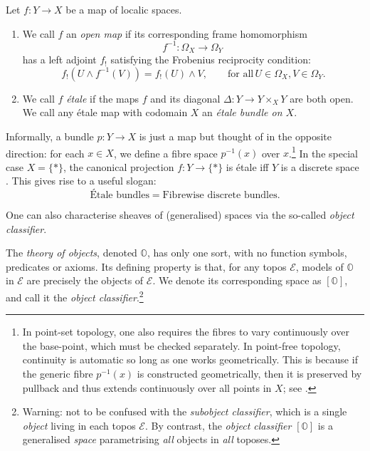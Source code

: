 \documentclass[a4paper, 11pt,reqno]{amsart}
\newcommand{\E}{\mathcal{E}}
\begin{document}
\begin{definition}\label{def:etale} Let $f\colon Y\rightarrow X$ be a map of localic spaces. 
\begin{enumerate}[label=(\roman*)]
	\item We call $f$ an {\em open map} if its corresponding frame homomorphism 
	$$f^{-1}\colon\Omega_{X}\rightarrow\Omega_Y\,$$
	has a left adjoint $f_!$ satisfying the Frobenius reciprocity condition:
	\[f_!(U\land f^{-1}(V))=f_!(U)\land V,\qquad\text{for all}\, U\in\Omega_X,V\in\Omega_{Y}.\]
	\item We call $f$ \emph{\'{e}tale} if the maps $f$ and its diagonal $\Delta\colon Y\to Y\times_X Y$ are both open. We call any \'{e}tale map with codomain $X$ an \emph{\'{e}tale bundle on $X$}. 
\end{enumerate}
\end{definition}

\begin{discussion}\label{dis:fibrewiseDISCRETE} Informally, a bundle $p\colon Y\to X$ is just a map but thought of in the opposite direction: for each $x\in X$, we define a fibre space $p^{-1}(x)$ over $x$.\footnote{In point-set topology, one also requires the fibres to vary continuously over the base-point, which must be checked separately. In point-free topology, continuity is automatic so long as one works geometrically. This is because if the generic fibre $p^{-1}(x)$ is constructed geometrically, then it is preserved by pullback and thus extends continuously over all points in $X$; see \cite[\S 9]{VickersPtfreePtwise}.} In the special case $X=\{*\}$, the canonical projection $f\colon Y\to \{*\}$ is \'{e}tale iff $Y$ is a discrete space \cite[Theorem V.5.1]{JoyalTierney}.  This gives rise to a useful slogan: 
$$\text{\'{E}tale bundles} = \text{Fibrewise discrete bundles}.$$
\end{discussion}

One can also characterise sheaves of (generalised) spaces via the so-called {\em object classifier}.

\begin{definition} The {\em theory of objects}, denoted $\mathbb{O}$, has only one sort, with no function symbols, predicates or axioms. Its defining property is that, for any topos $\E$, models of $\mathbb{O}$ in $\E$ are precisely the objects of $\E$. We denote its corresponding space as $[\mathbb{O}]$, and call it the \emph{object classifier}.\footnote{Warning: not to be confused with the \emph{subobject classifier}, which is a single \emph{object} living in each topos $\E$. By contrast, the \emph{object classifier} $[\mathbb{O}]$ is a generalised {\em
	space} parametrising {\em all} objects in {\em all} toposes.} %
\end{definition}
\end{document}
